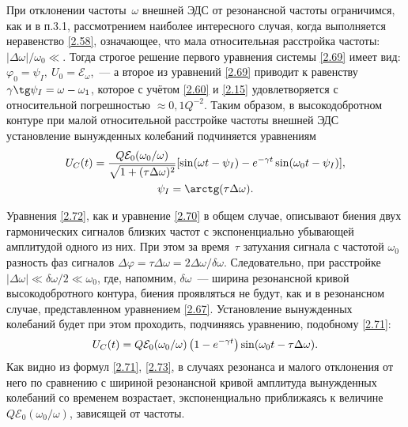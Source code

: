 При отклонении частоты~$\omega$ внешней ЭДС от резонансной частоты
ограничимся, как и в п.3.1, рассмотрением наиболее интересного случая, когда
выполняется неравенство \eqref{2.58}, означающее, что мала относительная
расстройка частоты: $|\Delta\omega|/\omega_0\ll$. Тогда строгое решение первого
уравнения системы \eqref{2.69} имеет вид:
$\varphi_0=\psi_I,~U_0=\mathcal{E}_{\omega}$,~--- а второе из уравнений
\eqref{2.69} приводит к равенству $\gamma\tg\psi_I=\omega-\omega_1$, которое с
учётом \eqref{2.60} и \eqref{2.15} удовлетворяется с относительной погрешностью
$\approx0,1Q^{-2}$. Таким образом, в высокодобротном контуре при малой
относительной расстройке частоты внешней ЭДС установление вынужденных колебаний
подчиняется уравнениям
\begin{equation}
	\eqmark{2.72}
	\begin{gathered}[c]
U_C(t)=\dfrac{Q\mathcal{E}_0(\omega_0/\omega)}{\sqrt{1+(\tau\Delta\omega)^2}}[
\sin(\omega t-\psi_I)-e^{-\gamma t}\sin(\omega_0t-\psi_I)],\\
		\psi_I=\arctg(\tau\Delta\omega).
	\end{gathered}
\end{equation}

Уравнения \eqref{2.72}, как и уравнение \eqref{2.70} в общем случае, описывают
биения двух гармонических сигналов близких частот с экспоненциально убывающей
амплитудой одного из них. При этом за время~$\tau$ затухания сигнала с частотой
$\omega_0$ разность фаз сигналов
$\Delta\varphi=\tau\Delta\omega=2\Delta\omega/\delta\omega$. Следовательно, при
расстройке $|\Delta\omega|\ll\delta\omega/2\ll\omega_0$, где, напомним,
$\delta\omega$~--- ширина резонансной кривой высокодобротного контура, биения
проявляться не будут, как и в резонансном случае, представленном уравнением
\eqref{2.67}. Установление вынужденных колебаний будет при этом проходить,
подчиняясь уравнению, подобному \eqref{2.71}:
\begin{equation}\eqmark{2.73}
	U_C(t)=Q\mathcal{E}_0(\omega_0/\omega)\left(1-e^{-\gamma
t}\right)\sin(\omega_0t-\tau\Delta\omega).
\end{equation}
Как видно из формул \eqref{2.71}, \eqref{2.73}, в случаях резонанса и малого
отклонения от него по сравнению с шириной резонансной кривой амплитуда
вынужденных колебаний со временем возрастает, экспоненциально приближаясь к
величине \\$Q\mathcal{E}_0(\omega_0/\omega)$, зависящей от частоты.

